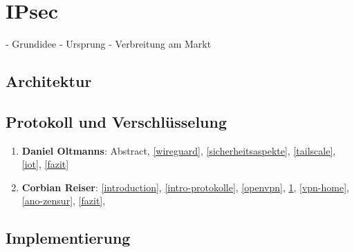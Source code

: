 \section{IPsec} \label{ipsec}

- Grundidee
- Ursprung
- Verbreitung am Markt

\subsection{Architektur}

\subsection{Protokoll und Verschlüsselung}

\begin{enumerate}
    \item \textbf{Daniel Oltmanns}: Abstract, \ref{wireguard}, \ref{sicherheitsaspekte}, \ref{tailscale}, \ref{iot}, \ref{fazit}
    \item \textbf{Corbian Reiser}: \ref{introduction}, \ref{intro-protokolle}, \ref{openvpn}, \ref{ipsec}, \ref{vpn-home}, \ref{ano-zensur}, \ref{fazit}, 
\end{enumerate}

\subsection{Implementierung}